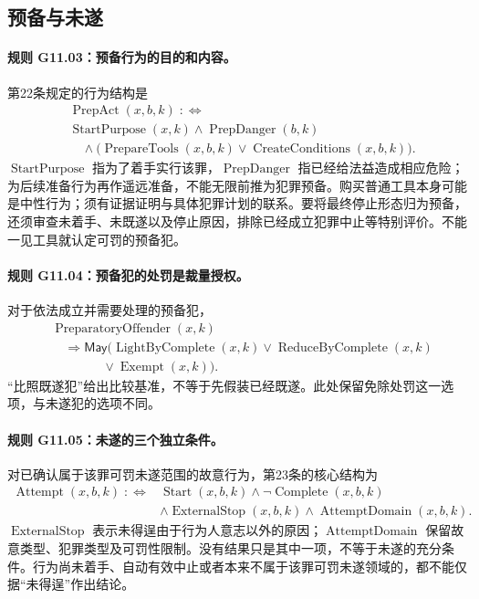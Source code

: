 \subsection{预备与未遂}
\paragraph{规则 G11.03：预备行为的目的和内容。}
第22条规定的行为结构是
\[
\begin{aligned}
&\operatorname{PrepAct}(x,b,k)\;:\!\!\iff\\
&\operatorname{StartPurpose}(x,k)\land\operatorname{PrepDanger}(b,k)\\
&\quad\land\bigl(\operatorname{PrepareTools}(x,b,k)
\lor\operatorname{CreateConditions}(x,b,k)\bigr).
\end{aligned}
\]
$\operatorname{StartPurpose}$ 指为了着手实行该罪，$\operatorname{PrepDanger}$ 指已经给法益造成相应危险；为后续准备行为再作遥远准备，不能无限前推为犯罪预备。购买普通工具本身可能是中性行为；须有证据证明与具体犯罪计划的联系。要将最终停止形态归为预备，还须审查未着手、未既遂以及停止原因，排除已经成立犯罪中止等特别评价。不能一见工具就认定可罚的预备犯。

\paragraph{规则 G11.04：预备犯的处罚是裁量授权。}
对于依法成立并需要处理的预备犯，
\[
\begin{aligned}
&\operatorname{PreparatoryOffender}(x,k)\\
&\quad\Longrightarrow\mathsf{May}\bigl(
\operatorname{LightByComplete}(x,k)\lor\operatorname{ReduceByComplete}(x,k)\\
&\qquad\qquad\lor\operatorname{Exempt}(x,k)\bigr).
\end{aligned}
\]
“比照既遂犯”给出比较基准，不等于先假装已经既遂。此处保留免除处罚这一选项，与未遂犯的选项不同。

\paragraph{规则 G11.05：未遂的三个独立条件。}
对已确认属于该罪可罚未遂范围的故意行为，第23条的核心结构为
\[
\begin{aligned}
\operatorname{Attempt}(x,b,k)\;:\!\!\iff{}&
\operatorname{Start}(x,b,k)\land\neg\operatorname{Complete}(x,b,k)\\
&\land\operatorname{ExternalStop}(x,b,k)
\land\operatorname{AttemptDomain}(x,b,k).
\end{aligned}
\]
$\operatorname{ExternalStop}$ 表示未得逞由于行为人意志以外的原因；$\operatorname{AttemptDomain}$ 保留故意类型、犯罪类型及可罚性限制。没有结果只是其中一项，不等于未遂的充分条件。行为尚未着手、自动有效中止或者本来不属于该罪可罚未遂领域的，都不能仅据“未得逞”作出结论。

